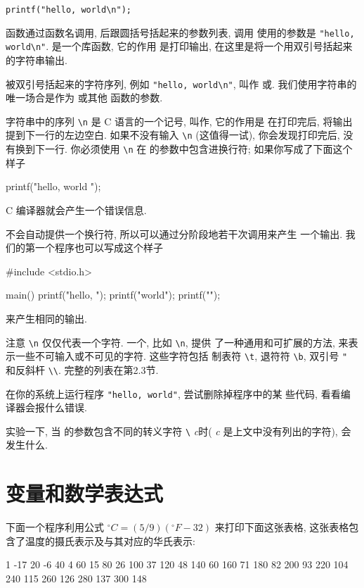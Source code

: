 \verb=printf("hello, world\n");=

函数通过函数名调用, 后跟圆括号括起来的参数列表, 调用 \printf 
使用的参数是 \verb="hello, world\n"=. \printf 是一个库函数, 它的作用
是打印输出, 在这里是将一个用双引号括起来的字符串输出.

被双引号括起来的字符序列, 例如 \verb="hello, world\n"=, 叫作%
或. 我们使用字符串的唯一场合是作为 \printf 或其他
函数的参数.

字符串中的序列 \verb"\n" 是 C 语言的一个记号, 叫作, 它的作用是
在打印完后, 将输出提到下一行的左边空白. 如果不没有输入 \verb"\n"
(这值得一试), 你会发现打印完后, 没有换到下一行. 你必须使用 \verb"\n" 在
\printf 的参数中包含进换行符; 如果你写成了下面这个样子
\begin{myverbatim}
printf("hello, world 
");
\end{myverbatim}
C 编译器就会产生一个错误信息.

\printf 不会自动提供一个换行符, 所以可以通过分阶段地若干次调用来产生
一个输出. 我们的第一个程序也可以写成这个样子
\begin{myverbatim}
#include <stdio.h>

main()
{
    printf("hello, ");
    printf("world");
    printf("\n");
}
\end{myverbatim}
来产生相同的输出.

注意 \verb"\n" 仅仅代表一个字符. 一个, 比如 \verb"\n", 提供
了一种通用和可扩展的方法, 来表示一些不可输入或不可见的字符. 这些字符包括
制表符 \verb"\t", 退符符 \verb"\b", 双引号 \verb="= 和反斜杆 \verb"\\".
完整的列表在第2.3节.

\exercise 在你的系统上运行程序 \verb="hello, world"=, 尝试删除掉程序中的某
些代码, 看看编译器会报什么错误.

\exercise 实验一下, 当 \printf 的参数包含不同的转义字符 \verb"\"%
\textit{c}时( \textit{c} 是上文中没有列出的字符), 会发生什么.

\section{变量和数学表达式}
下面一个程序利用公式 $^\circ{C} = (5/9)(^\circ{F}-32)$ 来打印下面这张表格, 
这张表格包含了温度的摄氏表示及与其对应的华氏表示:
\begin{myverbatim}
1       -17
20      -6
40      4
60      15 
80      26
100     37 
120     48
140     60 
160     71
180     82
200     93
220     104 
240     115 
260     126 
280     137
300     148
\end{myverbatim}

